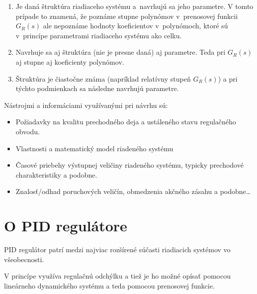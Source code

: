 \documentclass[a4paper, 10pt, ]{article}
\begin{document}
\begin{enumerate}[leftmargin=0pt, labelsep=4mm, itemsep=0pt]
    \item Je daná štruktúra riadiaceho systému a~navrhujú sa jeho parametre. \newline V tomto prípade to znamená, že poznáme stupne polynómov v~prenosovej funkcii $G_R(s)$ ale nepoznáme hodnoty koeficientov v~polynómoch, ktoré sú v~princípe parametrami riadiaceho systému ako celku.

    \item Navrhuje sa aj štruktúra (nie je presne daná) aj parametre. \newline Teda pri $G_R(s)$ aj stupne aj koeficienty polynómov.

    \item Štruktúra je čiastočne známa (napríklad relatívny stupeň $G_R(s)$) a pri týchto podmienkach sa následne navrhujú parametre.

\end{enumerate}

\noindent
Nástrojmi a informáciami využívanými pri návrhu sú:

\begin{itemize}[leftmargin=0pt, labelsep=4mm, itemsep=0pt]

    \item Požiadavky na kvalitu prechodného deja a ustáleného stavu regulačného obvodu.

    \item Vlastnosti a matematický model riadeného systému

    \item Časové priebehy výstupnej veličiny riadeného systému, typicky prechodové charakteristiky a podobne.

    \item Znalosť/odhad poruchových veličín, obmedzenia akčného zásahu a podobne\ldots
\end{itemize}










\section{O PID regulátore}

PID regulátor patrí medzi najviac rozšírené súčasti riadiacich systémov vo všeobecnosti.

V princípe využíva regulačnú odchýlku a tiež je ho možné opísať pomocou lineárneho dynamického systému a teda pomocou prenosovej funkcie.
\end{document}
